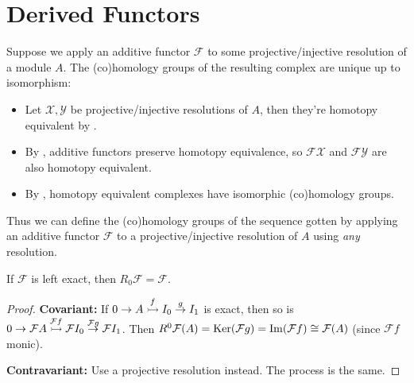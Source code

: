 \documentclass[twoside,10pt]{report}
\begin{document}
\section{Derived Functors}

Suppose we apply an additive functor $\mathcal{F}$ to some projective/injective resolution of a module $A$. The (co)homology groups of the resulting complex are unique up to isomorphism:
\begin{itemize}
	\item Let $\mathcal{X},\mathcal{Y}$ be projective/injective resolutions of $A$, then they're homotopy equivalent by .
	\item By , additive functors preserve homotopy equivalence, so $\mathcal{F}\mathcal{X}$ and $\mathcal{F}\mathcal{Y}$ are also homotopy equivalent.
	\item By , homotopy equivalent complexes have isomorphic (co)homology groups.
\end{itemize}

Thus we can define the (co)homology groups of the sequence gotten by applying an additive functor $\mathcal{F}$ to a projective/injective resolution of $A$ using \textit{any} resolution.



\begin{prop}
	\label{left-exact-right-derived}
	If $\mathcal{F}$ is left exact, then $R_0\mathcal{F}=\mathcal{F}$.
\end{prop}
\begin{proof}
	\textbf{Covariant:} If $0\to A\stackrel{f}{\rightarrowtail } I_0 \stackrel{g}{\to } I_1$ is exact, then so is $0\to \mathcal{F}A\stackrel{\mathcal{F}f}{\rightarrowtail } \mathcal{F}I_0\stackrel{\mathcal{F}g}{\to } \mathcal{F}I_1 $. Then $R^{0}\mathcal{F}(A) = \operatorname{Ker} (\mathcal{F}g) = \operatorname{Im} (\mathcal{F}f) \cong \mathcal{F}(A)$ (since $\mathcal{F}f$ monic).

	\textbf{Contravariant:} Use a projective resolution instead. The process is the same.
\end{proof}



\end{document}
